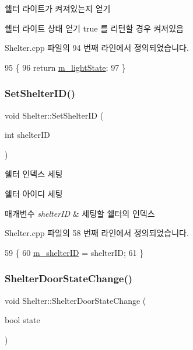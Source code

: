쉘터 라이트가 켜져있는지 얻기 

쉘터 라이트 상태 얻기  true 를 리턴할 경우 켜져있음 

Shelter.\+cpp 파일의 94 번째 라인에서 정의되었습니다.


\begin{DoxyCode}
95 \{
96     \textcolor{keywordflow}{return} \hyperlink{class_shelter_ad18359b14559c0f0e77fdb416b39529f}{m\_lightState};
97 \}
\end{DoxyCode}
\mbox{\label{class_shelter_a34b27753d72d2f4e18ed9132a956e3ac}} 
\subsubsection{\texorpdfstring{Set\+Shelter\+I\+D()}{SetShelterID()}}
{\footnotesize\ttfamily void Shelter\+::\+Set\+Shelter\+ID (\begin{DoxyParamCaption}\item[{int}]{shelter\+ID }\end{DoxyParamCaption})}



쉘터 인덱스 세팅 

쉘터 아이디 세팅


\begin{DoxyParams}{매개변수}
{\em shelter\+ID} & 세팅할 쉘터의 인덱스 \\
\hline
\end{DoxyParams}


Shelter.\+cpp 파일의 58 번째 라인에서 정의되었습니다.


\begin{DoxyCode}
59 \{
60     \hyperlink{class_shelter_a158439448d67e4991a19dd7175a78a0b}{m\_shelterID} = shelterID;
61 \}
\end{DoxyCode}
\mbox{\label{class_shelter_af5319d96477a916f5c589f9d3e71d618}} 
\subsubsection{\texorpdfstring{Shelter\+Door\+State\+Change()}{ShelterDoorStateChange()}}
{\footnotesize\ttfamily void Shelter\+::\+Shelter\+Door\+State\+Change (\begin{DoxyParamCaption}\item[{bool}]{state }\end{DoxyParamCaption})}



